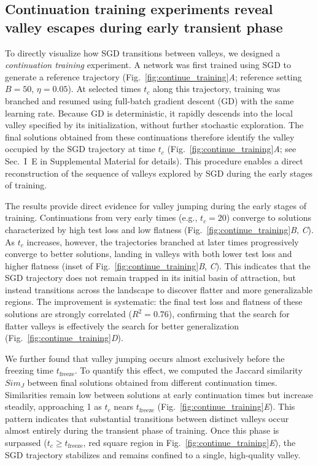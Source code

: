 \documentclass[aps,prx,reprint,superscriptaddress,longbibliography,nofootinbib,floatfix]{revtex4-2}
\begin{document}
\subsection{Continuation training experiments reveal valley escapes during early transient phase}

To directly visualize how SGD transitions between valleys, we designed a {\it continuation training} experiment. A network was first trained using SGD to generate a reference trajectory (Fig.~\ref{fig:continue_training}\textit{A}; reference setting $B = 50$, $\eta = 0.05$). At selected times $t_c$ along this trajectory, training was branched and resumed using full-batch gradient descent (GD) with the same learning rate. Because GD is deterministic, it rapidly descends into the local valley specified by its initialization, without further stochastic exploration. The final solutions obtained from these continuations therefore identify the valley occupied by the SGD trajectory at time $t_c$ (Fig.~\ref{fig:continue_training}\textit{A}; see Sec.~I~E in Supplemental Material for details). This procedure enables a direct reconstruction of the sequence of valleys explored by SGD during the early stages of training.

The results provide direct evidence for valley jumping during the early stages of training. Continuations from very early times (e.g., $t_c=20$) converge to solutions characterized by high test loss and low flatness (Fig.~\ref{fig:continue_training}\textit{B}, \textit{C}). As $t_c$ increases, however, the trajectories branched at later times progressively converge to better solutions, landing in valleys with both lower test loss and higher flatness (inset of Fig.~\ref{fig:continue_training}\textit{B}, \textit{C}). This indicates that the SGD trajectory does not remain trapped in its initial basin of attraction, but instead transitions across the landscape to discover flatter and more generalizable regions. The improvement is systematic: the final test loss and flatness of these solutions are strongly correlated ($R^2=0.76$), confirming that the search for flatter valleys is effectively the search for better generalization (Fig.~\ref{fig:continue_training}\textit{D}).

We further found that valley jumping occurs almost exclusively before the freezing time $t_{\mathrm{freeze}}$. To quantify this effect, we computed the Jaccard similarity $Sim_J$ between final solutions obtained from different continuation times. Similarities remain low between solutions at early continuation times but increase steadily, approaching 1 as $t_c$ nears $t_{\mathrm{freeze}}$ (Fig.~\ref{fig:continue_training}\textit{E}). This pattern indicates that substantial transitions between distinct valleys occur almost entirely during the transient phase of training. Once this phase is surpassed ($t_c \geq t_{\mathrm{freeze}}$, red square region in Fig.~\ref{fig:continue_training}\textit{E}), the SGD trajectory stabilizes and remains confined to a single, high-quality valley.
\end{document}
